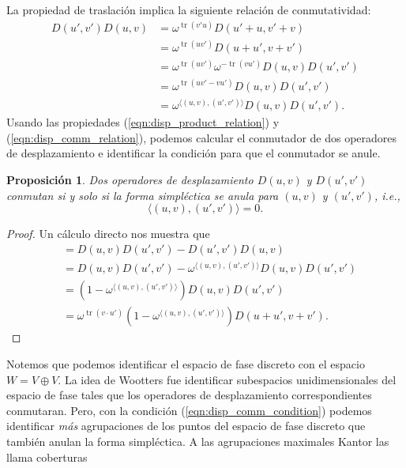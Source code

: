 \documentclass[a4paper,11pt]{report}
\DeclareMathOperator{\tr}{tr}
\newtheorem{proposition}{Proposición}
\begin{document}
  La propiedad de traslación implica la siguiente relación
  de conmutatividad:
  \begin{align}
    D(u',v')D(u,v)
    &= \omega^{\tr(v' u)} D(u'+u,v'+v) \\
    &= \omega^{\tr(u v')} D(u+u',v+v') \\
    &= \omega^{\tr(u v')} \omega^{-\tr(v u')}
    D(u,v)D(u',v') \\
    &= \omega^{\tr(u v' - v u')} D(u,v)D(u',v')
    \\
    &= \omega^{\langle (u,v), (u',v') \rangle}
    D(u,v)D(u',v') \label{eqn:disp_comm_relation}.
  \end{align}
  Usando las propiedades (\ref{eqn:disp_product_relation}) y
  (\ref{eqn:disp_comm_relation}), podemos calcular el
  conmutador de dos operadores de desplazamiento e
  identificar la condición para que el conmutador se anule.
  \begin{proposition}
    Dos operadores de desplazamiento $D(u,v)$ y $D(u',v')$
    conmutan si y solo si la forma simpléctica se anula para
    $(u,v)$ y $(u',v')$, i.e.,
    \begin{equation}
      \label{eqn:disp_comm_condition}
      \langle (u,v), (u',v') \rangle = 0.
    \end{equation}
  \end{proposition}
  \begin{proof}
    Un cálculo directo nos muestra que
    \begin{align}
      [D(u,v),D(u',v')]
      &= D(u,v)D(u',v') - D(u',v')D(u,v) \\
      &= D(u,v)D(u',v') - \omega^{\langle (u,v),(u',v')
      \rangle} D(u,v) D(u',v') \\
      &= \left( 1 - \omega^{\langle (u,v),(u',v') \rangle}
      \right) D(u,v)D(u',v') \\
      &= \omega^{\tr(v \cdot u')} \left( 1 - \omega^{\langle
      (u,v),(u',v') \rangle} \right) D(u+u',v+v').
      \label{eqn:disp_comm}
    \end{align}
  \end{proof}
  Notemos que podemos identificar el espacio de fase
  discreto con el espacio $W = V \oplus V$. La idea de
  Wootters fue identificar subespacios unidimensionales del
  espacio de fase tales que los operadores de desplazamiento
  correspondientes conmutaran. Pero, con la condición
  (\ref{eqn:disp_comm_condition}) podemos identificar
  \textit{más} agrupaciones de los puntos del espacio de
  fase discreto que también anulan la forma simpléctica. A
  las agrupaciones maximales Kantor las llama coberturas
\end{document}
